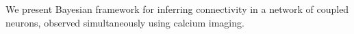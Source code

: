 We present Bayesian framework for inferring connectivity in a network
of coupled neurons, observed simultaneously using calcium imaging.
